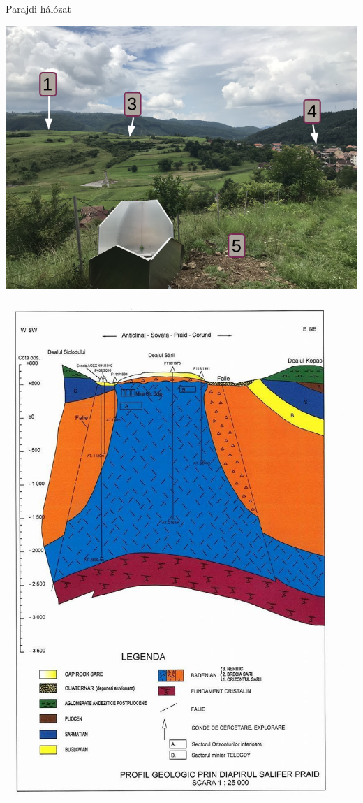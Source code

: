 \documentclass{beamer}
\begin{document}
\begin{frame}{Parajdi hálózat}
    \begin{minipage}[c]{0.475\textwidth}
        \includegraphics[width=\textwidth]{praid_refl.png}
    \end{minipage}
    \begin{minipage}[c]{0.475\textwidth}
        \includegraphics[width=\textwidth]{praid_schematic.png}
    \end{minipage}
\end{frame}
\end{document}

